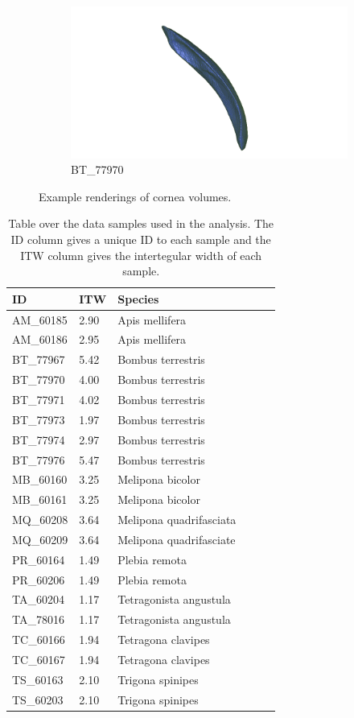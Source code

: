\begin{figure}[h]
\begin{subfigure}{.3 \linewidth}
  \centering
  \includegraphics[scale=0.2]{bt77970_cornea.png}
  \caption{BT\_77970}
  \end{subfigure}
  \caption{\label{corneas} Example renderings of cornea volumes.}
\end{figure}
\begin{table}[h]
\begin{center}
\begin{tabular}{*6l}
\toprule
  ID & ITW & Species  \\ \midrule
AM\_60185 & 2.90 & Apis mellifera \\
AM\_60186 & 2.95 & Apis mellifera \\
BT\_77967 & 5.42 & Bombus terrestris \\
BT\_77970 & 4.00 & Bombus terrestris \\
BT\_77971 & 4.02 & Bombus terrestris \\
BT\_77973 & 1.97 & Bombus terrestris \\
BT\_77974 & 2.97 & Bombus terrestris \\
BT\_77976 & 5.47 & Bombus terrestris \\
MB\_60160 & 3.25 & Melipona bicolor \\
MB\_60161 & 3.25 & Melipona bicolor \\
MQ\_60208 & 3.64 & Melipona quadrifasciata \\
MQ\_60209 & 3.64 & Melipona quadrifasciate \\
PR\_60164 & 1.49 & Plebia remota \\
PR\_60206 & 1.49 & Plebia remota \\
TA\_60204 & 1.17 & Tetragonista angustula \\
TA\_78016 & 1.17 & Tetragonista angustula \\
TC\_60166 & 1.94 & Tetragona clavipes \\
TC\_60167 & 1.94 & Tetragona clavipes \\
TS\_60163 & 2.10 & Trigona spinipes \\
TS\_60203 & 2.10 & Trigona spinipes \\
  \bottomrule
\end{tabular}
\caption{Table over the data samples used in the analysis. The ID column gives a unique ID to each sample and the ITW column gives the intertegular width of each sample.}
\label{bees}
\end{center}
\end{table}
